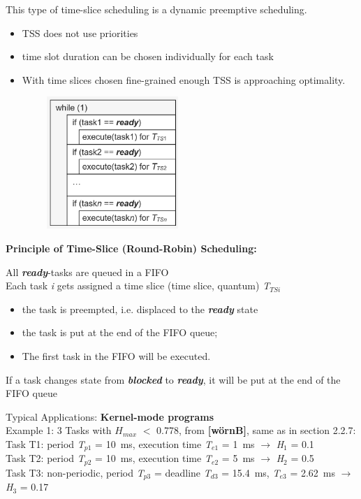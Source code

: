 This type of time-slice scheduling is a dynamic preemptive scheduling. 

\begin{itemize}
	\item TSS does not use priorities
	\item time slot duration can be chosen individually for each task
	\item With time slices chosen fine-grained enough TSS is approaching optimality.
\end{itemize}

	\begin{figure}[h]
    \centering
    \includegraphics[width=6cm, height=5cm]{Images/image90.png}
    \label{fig:Fig 35}
    \end{figure}
\newpage
\textbf{Principle of Time-Slice (Round-Robin) Scheduling: }

\begin{tcolorbox}[colback=blue!5!white,colframe=blue!75!black]
  All \textbf{\textit{ready}}-tasks are queued in a FIFO \\
  Each task \textit{i} gets assigned a time slice (time slice, quantum) \textit{T${}_{TSi}$}
  \begin{itemize}
		\item  the task is preempted, i.e. displaced to the \textbf{\textit{ready}} state
		\item  the task is put at the end of the FIFO queue;
		\item  The first task in the FIFO will be executed.
	\end{itemize}
  
  If a task changes state from \textbf{\textit{blocked}} to \textbf{\textit{ready}}, it will be put at the end of the FIFO queue
\end{tcolorbox}

Typical Applications: \textbf{Kernel-mode programs} \\ 

Example 1: 3 Tasks with $H_{max}$ $<$ 0.778, from \textbf{[wörnB]}, same as in section 2.2.7:\\
Task T1: period \textit{T}${}_{p1}$ = 10~ms, execution time \textit{T}${}_{e1}$ = 1~ms $\rightarrow$ \textit{H}${}_{1}$ = 0.1\\
Task T2: period \textit{T}${}_{p2}$ = 10~ms, execution time\textit{ T}${}_{e2}$ = 5~ms $\rightarrow$ \textit{H}${}_{2}$ = 0.5\\
Task T3: non-periodic, period \textit{T}${}_{p3}$ = deadline \textit{T}${}_{d3}$ = 15.4~ms, \textit{T}${}_{e3}$ = 2.62~ms $\rightarrow$ \textit{H}${}_{3}$ = 0.17\\


